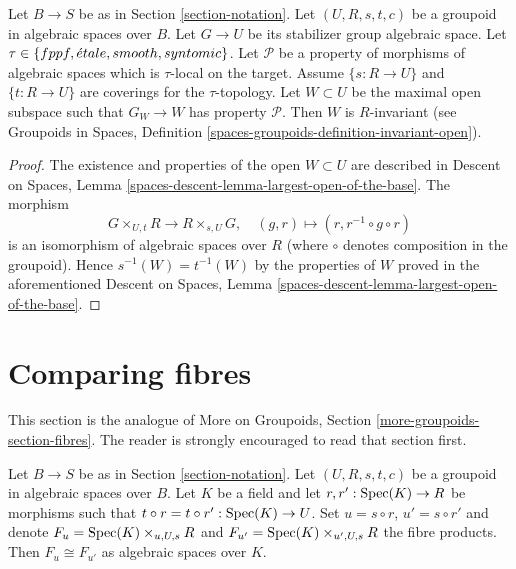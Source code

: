 \begin{lemma}
\label{lemma-property-G-invariant}
Let $B \to S$ be as in Section \ref{section-notation}.
Let $(U, R, s, t, c)$ be a groupoid in algebraic spaces over $B$.
Let $G \to U$ be its stabilizer group algebraic space.
Let
$\tau \in \{fppf, \linebreak[0] \acute{e}tale, \linebreak[0]
smooth, \linebreak[0] syntomic\}$.
Let $\mathcal{P}$ be a property of morphisms of algebraic spaces
which is $\tau$-local on the target.
Assume $\{s : R \to U\}$ and $\{t : R \to U\}$ are coverings for the
$\tau$-topology. Let $W \subset U$ be the maximal open subspace such that
$G_W \to W$ has property $\mathcal{P}$.
Then $W$ is $R$-invariant (see
Groupoids in Spaces,
Definition \ref{spaces-groupoids-definition-invariant-open}).
\end{lemma}

\begin{proof}
The existence and properties of the open $W \subset U$ are described in
Descent on Spaces, Lemma \ref{spaces-descent-lemma-largest-open-of-the-base}.
The morphism
$$
G \times_{U, t} R \longrightarrow R \times_{s, U} G, \quad
(g, r) \longmapsto (r, r^{-1} \circ g \circ r)
$$
is an isomorphism of algebraic spaces over $R$ (where $\circ$ denotes
composition in the groupoid). Hence $s^{-1}(W) = t^{-1}(W)$ by the
properties of $W$ proved in the aforementioned
Descent on Spaces, Lemma \ref{spaces-descent-lemma-largest-open-of-the-base}.
\end{proof}




\section{Comparing fibres}
\label{section-fibres}

\noindent
This section is the analogue of
More on Groupoids, Section \ref{more-groupoids-section-fibres}.
The reader is strongly encouraged to read that section first.

\begin{lemma}
\label{lemma-two-fibres}
Let $B \to S$ be as in Section \ref{section-notation}.
Let $(U, R, s, t, c)$ be a groupoid in algebraic spaces over $B$.
Let $K$ be a field and let $r, r' : \mathop{\rm Spec}(K) \to R$
be morphisms such that $t \circ r = t \circ r' : \mathop{\rm Spec}(K) \to U$.
Set $u = s \circ r$, $u' = s \circ r'$ and denote
$F_u = \mathop{\rm Spec}(K) \times_{u, U, s} R$ and
$F_{u'} = \mathop{\rm Spec}(K) \times_{u', U, s} R$ the fibre products.
Then $F_u \cong F_{u'}$ as algebraic spaces over $K$.
\end{lemma}

